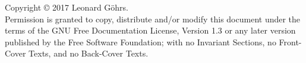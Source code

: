 \begin{center}
  Copyright © 2017 Leonard Göhrs. \\

  Permission is granted to copy, distribute and/or modify this document
  under the terms of the GNU Free Documentation License, Version 1.3
  or any later version published by the Free Software Foundation;
  with no Invariant Sections, no Front-Cover Texts, and no Back-Cover Texts.
\end{center}
